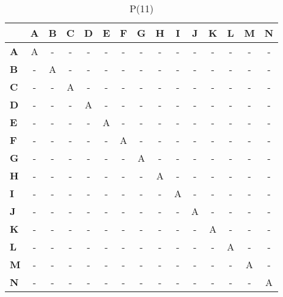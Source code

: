 \documentclass{article}
\begin{document}
\begin{table}[H]\centering
\caption{P(11)}
\begin{tabular}{l c c c c c c c c c c c c c c}
\toprule
 & \textbf{A} & \textbf{B} & \textbf{C} & \textbf{D} & \textbf{E} & \textbf{F} & \textbf{G} & \textbf{H} & \textbf{I} & \textbf{J} & \textbf{K} & \textbf{L} & \textbf{M} & \textbf{N}\\\midrule
\textbf{A} & A & - & - & - & - & - & - & - & - & - & - & - & - & - \\
\textbf{B} & - & A & - & - & - & - & - & - & - & - & - & - & - & - \\
\textbf{C} & - & - & A & - & - & - & - & - & - & - & - & - & - & - \\
\textbf{D} & - & - & - & A & - & - & - & - & - & - & - & - & - & - \\
\textbf{E} & - & - & - & - & A & - & - & - & - & - & - & - & - & - \\
\textbf{F} & - & - & - & - & - & A & - & - & - & - & - & - & - & - \\
\textbf{G} & - & - & - & - & - & - & A & - & - & - & - & - & - & - \\
\textbf{H} & - & - & - & - & - & - & - & A & - & - & - & - & - & - \\
\textbf{I} & - & - & - & - & - & - & - & - & A & - & - & - & - & - \\
\textbf{J} & - & - & - & - & - & - & - & - & - & A & - & - & - & - \\
\textbf{K} & - & - & - & - & - & - & - & - & - & - & A & - & - & - \\
\textbf{L} & - & - & - & - & - & - & - & - & - & - & - & A & - & - \\
\textbf{M} & - & - & - & - & - & - & - & - & - & - & - & - & A & - \\
\textbf{N} & - & - & - & - & - & - & - & - & - & - & - & - & - & A \\
\bottomrule
\end{tabular}
\end{table}
\end{document}
